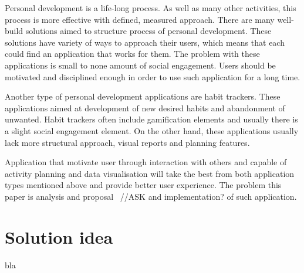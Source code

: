 Personal development is a life-long process.
As well as many other activities, this process is more effective with defined, measured approach.
There are many well-build solutions aimed to structure process of personal development.
These solutions have variety of ways to approach their users, which means that each could find an application that works for them.
The problem with these applications is small to none amount of social engagement.
Users should be motivated and disciplined enough in order to use such application for a long time.

Another type of personal development applications are habit trackers.
These applications aimed at development of new desired habits and abandonment of unwanted.
Habit trackers often include gamification elements and usually there is a slight social engagement element.
On the other hand, these applications usually lack more structural approach, visual reports and planning features.

Application that motivate user through interaction with others and capable of activity planning and data visualisation
will take the best from both application types mentioned above and provide better user experience.
The problem this paper is analysis and proposal ~{\color{gray}//ASK and implementation?} of such application.

\section{Solution idea}\label{sec:solution-idea}

bla